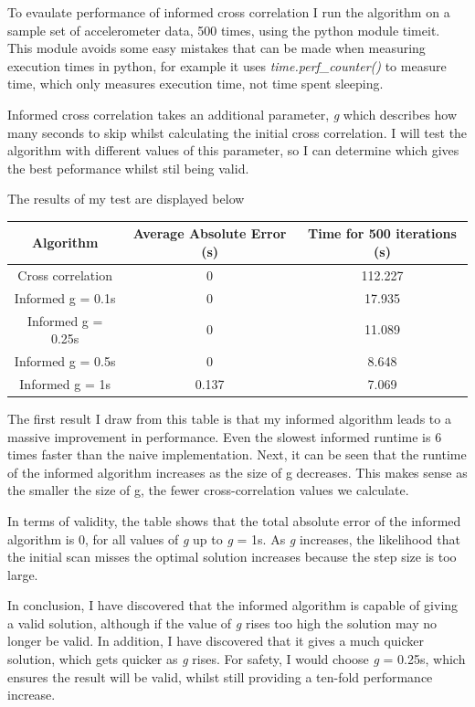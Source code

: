 \documentclass[12pt,a4paper,twoside,openright]{report}
\begin{document}
To evaulate performance of informed cross correlation I run the
algorithm on a sample set of accelerometer data, 500 times, using the python
module timeit. This module avoids some easy mistakes that can be made when
measuring execution times in python, for example it uses
\emph{time.perf\_counter()} to measure time, which only measures execution
time, not time spent sleeping.

Informed cross correlation takes an additional parameter,
\emph{g} which describes how many seconds to skip whilst
calculating the initial cross correlation. I will test the algorithm with different
values of this parameter, so I can determine which gives the best peformance
whilst stil being valid. 

The results of my test are displayed below 
\begin{center}
\begin{tabular}{ | c | c | c | }
	\hline
	Algorithm & Average Absolute Error (s) & Time for 500
	iterations (s)\\ 
	\hline
	Cross correlation & 0 & 112.227 \\  
	Informed g = 0.1s & 0 & 17.935 \\    
	Informed g = 0.25s & 0 & 11.089 \\    
	Informed g = 0.5s & 0 & 8.648 \\    
	Informed g = 1s & 0.137 & 7.069  \\
	\hline
   \end{tabular}
\end{center}

The first result I draw from this table is that my informed algorithm leads to
a massive improvement in performance. Even the slowest informed runtime is 6
times faster than the naive implementation. Next, it can be seen that the
runtime of the informed algorithm increases as the size of g decreases. This
makes sense as the smaller the size of g, the fewer cross-correlation values
we calculate.

In terms of validity, the table shows that the total absolute error of the
informed algorithm is 0, for all values of \emph{g} up to \emph{g} = 1s. As
\emph{g} increases, the likelihood that the initial scan misses the optimal
solution increases because the step size is too large. 

In conclusion, I have discovered that the informed algorithm is capable of
giving a valid solution, although if the value of \emph{g} rises too high the
solution may no longer be valid. In addition, I have discovered that it gives
a much quicker solution, which gets quicker as \emph{g} rises. For safety, I
would choose \emph{g} = 0.25s, which ensures the result will be valid, whilst
still providing a ten-fold performance increase.
\end{document}

